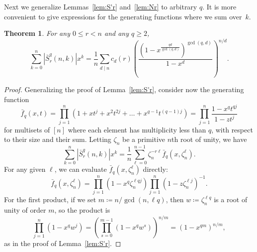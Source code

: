 \documentclass[12pt]{article}
\newcommand{\card}[1]{\left|#1\right|}
\newcommand{\nroot}{\zeta_n} %
\newcommand{\bS}{\bar{S}}
\newtheorem{theorem}{Theorem}[section]
\theoremstyle{definition}
\begin{document}
Next we generalize Lemmas~\ref{lem:S'r} and~\ref{lem:Nr} to arbitrary $q$. It is more convenient to give expressions for the generating functions where we sum over~$k$.

\begin{theorem}
    \label{thm:q-S}
    For any $0\le r< n$ and any $q \ge 2$,
    \begin{equation*}
        \sum_{k=0}^n \card{\bS_r^q(n, k)} x^k
        =
        \frac{1}{n}
        \sum_{d \mid n} c_{d}(r)
            \left(
                \frac{\left(1 - x^{\frac{qd}{\gcd(q, d)}}\right)^{\gcd(q, d)}}{1 - x^d}
            \right)^{n/d}.
    \end{equation*}
\end{theorem}

\begin{proof}
Generalizing the proof of Lemma~\ref{lem:S'r}, consider now the generating function 
    \begin{equation*}
        \bar{f}_q(x,t) = \prod_{j = 1}^n (1 + x t^j+x^2t^{2j}+\dots+x^{q-1}t^{(q-1)j}) = \prod_{j = 1}^n \frac{1-x^qt^{qj}}{1-zt^j}
    \end{equation*}
    for multisets of $[n]$ where each element has multiplicity less than $q$, with respect to their size and their sum. Letting $\nroot$ be a primitive $n$th root of unity, we have
    \begin{equation}
        \label{eqn:big-sum}
        \sum_{k=0}^n \card{\bS_r^q(n, k)} x^k
        =
        \frac{1}{n} \sum_{\ell = 0}^{n-1} \nroot^{-r\ell} \bar{f}_q(x,\nroot^{\ell}).
    \end{equation}
    For any given $\ell$, we can evaluate $\bar{f}_q(x, \nroot^\ell)$ directly:
    \[
        \bar{f}_q(x, \nroot^\ell)
        = \prod_{j = 1}^n (1-x^q\nroot^{\ell qj}) \prod_{j = 1}^n (1-z\nroot^{\ell j})^{-1}.
    \]
    For the first product, if we set $m \coloneqq n / \gcd(n, \ell q)$, then $w \coloneqq
    \nroot^{\ell q}$ is a root of unity of order $m$, so the product is
    \[
             \prod_{j = 1}^n (1 - x^q w^j)
            = \left(\prod_{s = 0}^{m-1} (1 - x^q w^s)\right)^{n/m}
            =\left(1 - x^{qm}\right)^{n/m},
    \]
    as in the proof of Lemma~\ref{lem:S'r}.


\end{proof}
\end{document}
